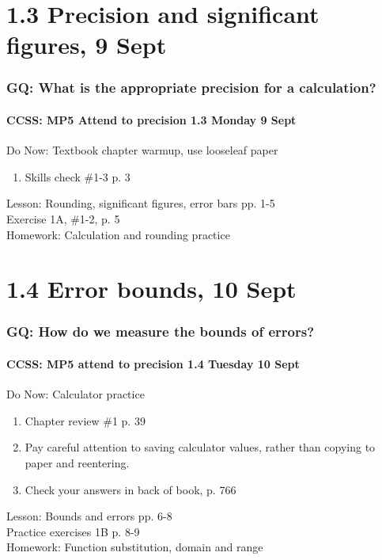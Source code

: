 \documentclass{beamer}
\begin{document}
  \section{1.3 Precision and significant figures, 9 Sept}
  \frame
  {
    \frametitle{GQ: What is the appropriate precision for a calculation?}
    \framesubtitle{CCSS: MP5 Attend to precision \hfill \alert{1.3 Monday 9 Sept}}

    \begin{block}{Do Now: Textbook chapter warmup, use looseleaf paper}
    \begin{enumerate}
        \item Skills check \#1-3 p. 3
    \end{enumerate}
    \end{block}
    Lesson: Rounding, significant figures, error bars pp. 1-5\\
    Exercise 1A, \#1-2, p. 5
    \\[0.5cm]
    Homework: Calculation and rounding practice
  }

  \section{1.4 Error bounds, 10 Sept}
  \frame
  {
    \frametitle{GQ: How do we measure the bounds of errors?}
    \framesubtitle{CCSS: MP5 attend to precision \hfill \alert{1.4 Tuesday 10 Sept}}

    \begin{block}{Do Now: Calculator practice}
    \begin{enumerate}
        \item Chapter review \#1 p. 39
        \item Pay careful attention to saving calculator values, rather than copying to paper and reentering.
        \item Check your answers in back of book, p. 766
    \end{enumerate}
    \end{block}
    Lesson: Bounds and errors pp. 6-8\\ \bigskip
    Practice exercises 1B p. 8-9\\
    Homework: Function substitution, domain and range
  }
\end{document}
